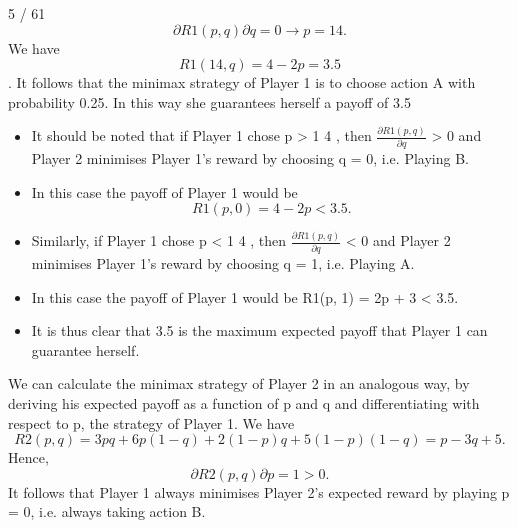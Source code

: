 \documentclass[]{article}
\begin{document}
	5 / 61
	\[ \partial R1(p, q)
	\partial q
	= 0 \rightarrow p =
	1
	4
	.\]
	We have
	\[R1(
	1
	4
	, q) = 4 − 2p = 3.5\].
	It follows that the minimax strategy of Player 1 is to choose action
	A with probability 0.25. In this way she guarantees herself a payoff
	of 3.5
	\begin{itemize}
		\item It should be noted that if Player 1 chose p >
		1
		4
		, then $\frac{\partial R1(p,q)}{\partial q}$ > 0
		and Player 2 minimises Player 1’s reward by choosing q = 0, i.e.
		Playing B.
		\item In this case the payoff of Player 1 would be
		\[R1(p, 0) = 4 − 2p < 3.5.\]
		\item 	Similarly, if Player 1 chose p <
		1
		4
		, then $\frac{\partial R1(p,q)}{\partial q}$ < 0 and Player 2
		minimises Player 1’s reward by choosing q = 1, i.e. Playing A.
		\item 	In this case the payoff of Player 1 would be
		R1(p, 1) = 2p + 3 < 3.5.
		\item  It is thus clear that 3.5 is the maximum
		expected payoff that Player 1 can guarantee herself.
	\end{itemize}
	
	We can calculate the minimax strategy of Player 2 in an analogous
	way, by deriving his expected payoff as a function of p and q and
	differentiating with respect to p, the strategy of Player 1. We have
	\[R2(p, q) = 3pq+6p(1−q)+2(1−p)q+5(1−p)(1−q) = p−3q+5.\]
	Hence,
	\[\partial R2(p, q)
	\partial p
	= 1 > 0.\]
	It follows that Player 1 always minimises Player 2’s expected
	reward by playing p = 0, i.e. always taking action B.
\end{document}

